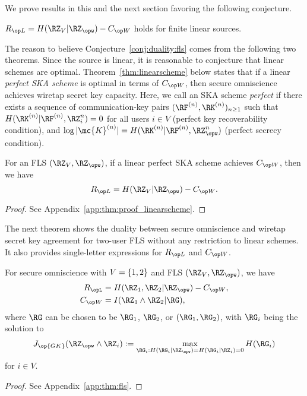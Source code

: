 We prove results in this and the next section favoring the following conjecture.
\begin{Conjecture}\label{conj:duality:fls}
$\rl = H(\RZ_V|\RZ_{\opw}) - \wskc$ holds for finite linear sources.
\end{Conjecture}

The reason to believe Conjecture~\ref{conj:duality:fls} comes from the following two theorems. Since the source is linear, it is reasonable to conjecture that linear schemes are optimal. Theorem~\ref{thm:linearscheme} below states that if a linear \emph{perfect SKA scheme} is optimal in terms of $\wskc$, then secure omniscience achieves wiretap secret key capacity. Here, we call an SKA scheme \emph{perfect} if there exists a sequence of communication-key pairs $(\RF^{(n)}, \RK^{(n)})_{n\geq1}$ such that 
$H(\RK^{(n)}|\RF^{(n)},\RZ_i^n) = 0$ for all users $i \in V$ (perfect key recoverability condition), and $\log |\mc{K}^{(n)}| = H(\RK^{(n)}| \RF^{(n)},\RZ_{\opw}^n)$ (perfect secrecy condition).

\begin{theorem}\label{thm:linearscheme}
  For an FLS $(\RZ_V,\RZ_{\opw})$, if a linear perfect SKA scheme achieves $\wskc$, then we have
  $$\rl = H(\RZ_V|\RZ_{\opw}) - \wskc.$$
\end{theorem}
\begin{proof}
See Appendix~\ref{app:thm:proof_linearscheme}.
\end{proof}


The next theorem shows the duality between secure omniscience and wiretap secret key agreement for two-user FLS without any restriction to linear schemes. It also provides single-letter expressions for $\rl$ and $\wskc$.

\begin{theorem}
  \label{thm:fls}
  For secure omniscience with $V=\{1,2\}$ and FLS $(\RZ_V,\RZ_{\opw})$, we have
  \begin{align}
    R_{\opL} &= H(\RZ_1,\RZ_2|\RZ_{\opw}) - \wskc,\\
    \wskc& = I(\RZ_1\wedge \RZ_2|\RG),\label{eq:fls}
  \end{align}
  where $\RG$ can be chosen to be $\RG_1$, $\RG_2$, or $(\RG_1,\RG_2)$, with $\RG_i$ being the solution to 
  \begin{align}
    J_{\op{GK}}(\RZ_{\opw}\wedge \RZ_i) := \max_{\RG_i: H(\RG_i|\RZ_{\opw})=H(\RG_i|\RZ_i)=0} H(\RG_i) \label{eq:JGK}
  \end{align}
  for $i\in V$.
\end{theorem}
\begin{proof}
See Appendix~\ref{app:thm:fls}.
\end{proof}

